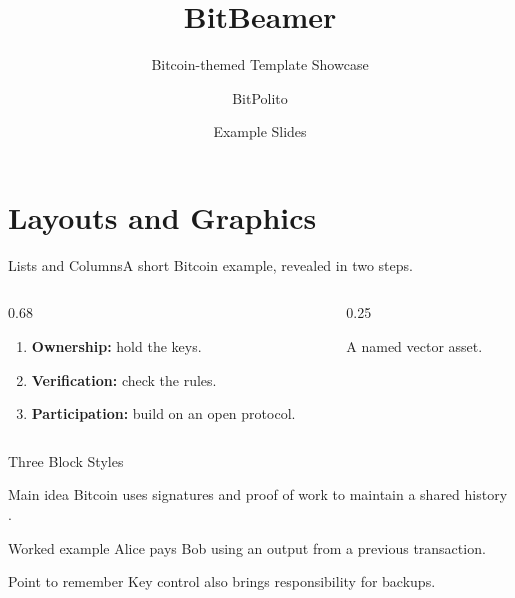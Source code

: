 \documentclass[aspectratio=169]{beamer}
\title[BitBeamer]{BitBeamer}
\subtitle{Bitcoin-themed Template Showcase}
\author[BitPolito]{BitPolito}
\institute{Bitcoin Student Community}
\date{Example Slides}
\begin{document}
\begin{frame}
  \titlepage
\end{frame}

\section{Layouts and Graphics}

\begin{frame}[label=showcase-start]{Lists and Columns}{A short Bitcoin example, revealed in two steps.}
\begin{columns}[c,onlytextwidth]
  \begin{column}{0.68\textwidth}
    \begin{enumerate}
    \item<1-> \textbf{Ownership:} hold the keys.
    \item<1-> \textbf{Verification:} check the rules.
    \item<2-| alert@2> \textbf{Participation:} build on an open protocol.
    \end{enumerate}
  \end{column}
  \begin{column}{0.25\textwidth}
    \centering
    \wallet[height=1.5cm]\par\medskip
    {\small A named vector asset.}
  \end{column}
\end{columns}
\end{frame}

\begin{frame}{Three Block Styles}
\begin{block}{Main idea}
Bitcoin uses signatures and proof of work to maintain a shared history
\cite{nakamoto2008}.
\end{block}
\begin{exampleblock}{Worked example}
Alice pays Bob using an output from a previous transaction.
\end{exampleblock}
\begin{alertblock}{Point to remember}
Key control also brings responsibility for backups.
\end{alertblock}
\end{frame}
\end{document}
